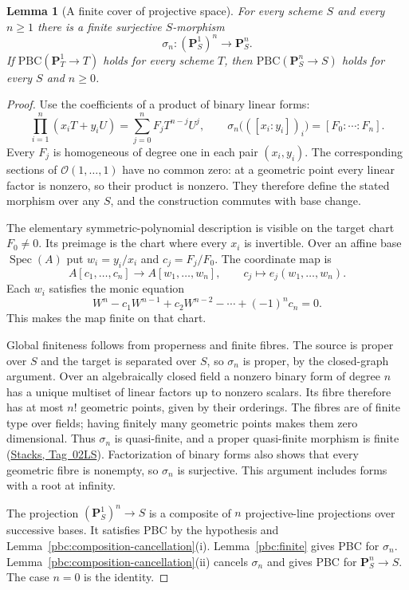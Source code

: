 \documentclass[11pt,a4paper]{article}
\numberwithin{equation}{section}
\newtheorem{lemma}[theorem]{Lemma}
\theoremstyle{definition}
\theoremstyle{remark}
\newcommand{\stacks}[1]{\href{https://stacks.math.columbia.edu/tag/#1}{\textnormal{Stacks, Tag~#1}}}
\begin{document}
\begin{lemma}[A finite cover of projective space]\label{pbc:symmetric-product}
For every scheme $S$ and every $n\geq1$ there is a finite surjective
$S$-morphism
\[
 \sigma_n:(\mathbf P^1_S)^n\longrightarrow\mathbf P^n_S.
\]
If $\mathrm{PBC}(\mathbf P^1_T\to T)$ holds for every scheme $T$, then
$\mathrm{PBC}(\mathbf P^n_S\to S)$ holds for every $S$ and $n\geq0$.
\end{lemma}

\begin{proof}
Use the coefficients of a product of binary linear forms:
\[
 \prod_{i=1}^n(x_iT+y_iU)
       =\sum_{j=0}^nF_jT^{n-j}U^j,\qquad
 \sigma_n\bigl(([x_i:y_i])_i\bigr)=[F_0:\cdots:F_n].
\]
Every $F_j$ is homogeneous of degree one in each pair $(x_i,y_i)$.
The corresponding sections of $\mathcal O(1,\ldots,1)$ have no common
zero: at a geometric point every linear factor is nonzero, so their
product is nonzero. They therefore define the stated morphism over any
$S$, and the construction commutes with base change.

The elementary symmetric-polynomial description is visible on the
target chart $F_0\ne0$. Its preimage is the chart where every $x_i$ is
invertible. Over an affine base $\operatorname{Spec}(A)$ put
$w_i=y_i/x_i$ and $c_j=F_j/F_0$. The coordinate map is
\[
 A[c_1,\ldots,c_n]\longrightarrow A[w_1,\ldots,w_n],
       \qquad c_j\longmapsto e_j(w_1,\ldots,w_n).
\]
Each $w_i$ satisfies the monic equation
\[
 W^n-c_1W^{n-1}+c_2W^{n-2}-\cdots+(-1)^nc_n=0.
\]
This makes the map finite on that chart.

Global finiteness follows from properness and finite fibres. The source
is proper over $S$ and the target is separated over $S$, so $\sigma_n$
is proper, by the closed-graph argument. Over an algebraically closed
field a nonzero binary form of degree $n$ has a unique multiset of
linear factors up to nonzero scalars. Its fibre therefore has at most
$n!$ geometric points, given by their orderings. The fibres are of
finite type over fields; having finitely many geometric points makes
them zero dimensional. Thus $\sigma_n$ is quasi-finite, and a proper
quasi-finite morphism is finite (\stacks{02LS}). Factorization of binary
forms also shows that every geometric fibre is nonempty, so $\sigma_n$
is surjective. This argument includes forms with a root at infinity.

The projection $(\mathbf P^1_S)^n\to S$ is a composite of $n$
projective-line projections over successive bases. It satisfies PBC by
the hypothesis and Lemma~\ref{pbc:composition-cancellation}(i).
Lemma~\ref{pbc:finite} gives PBC for $\sigma_n$.
Lemma~\ref{pbc:composition-cancellation}(ii) cancels $\sigma_n$ and gives
PBC for $\mathbf P^n_S\to S$. The case $n=0$ is the identity.
\end{proof}
\end{document}

